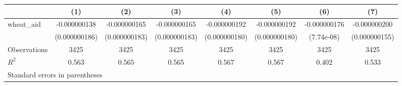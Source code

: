 \begin{tabular}{l*{7}{c}}
\toprule
                &\multicolumn{1}{c}{(1)}&\multicolumn{1}{c}{(2)}&\multicolumn{1}{c}{(3)}&\multicolumn{1}{c}{(4)}&\multicolumn{1}{c}{(5)}&\multicolumn{1}{c}{(6)}&\multicolumn{1}{c}{(7)}\\
\midrule
wheat\_aid       &-0.000000138&-0.000000165&-0.000000165&-0.000000192&-0.000000192&-0.000000176&-0.000000200\\
                &(0.000000186)&(0.000000183)&(0.000000183)&(0.000000180)&(0.000000180)&(7.74e-08)&(0.000000155)\\
\midrule
Observations    &     3425&     3425&     3425&     3425&     3425&     3425&     3425\\
\(R^{2}\)       &    0.563&    0.565&    0.565&    0.567&    0.567&    0.402&    0.533\\
\bottomrule
\multicolumn{8}{l}{\footnotesize Standard errors in parentheses}\\
\end{tabular}
